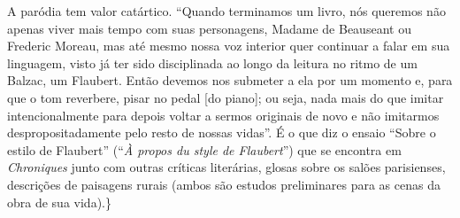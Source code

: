 A paródia tem valor catártico. ``Quando terminamos um livro, nós queremos
não apenas viver mais tempo com suas personagens, Madame de Beauseant ou
Frederic Moreau, mas até mesmo nossa voz interior quer continuar a falar
em sua linguagem, visto já ter sido disciplinada ao longo da leitura no
ritmo de um Balzac, um Flaubert. Então devemos nos submeter a ela por um
momento e, para que o tom reverbere, pisar no pedal {[}do piano{]}; ou
seja, nada mais do que imitar intencionalmente para depois voltar a
sermos originais de novo e não imitarmos despropositadamente pelo resto
de nossas vidas''. É o que diz o ensaio ``Sobre o estilo de Flaubert''
(``\emph{À propos du style de Flaubert}'') que se encontra em
\emph{Chroniques} junto com outras críticas literárias, glosas sobre os
salões parisienses, descrições de paisagens rurais (ambos são estudos
preliminares para as cenas da obra de sua vida).\}

